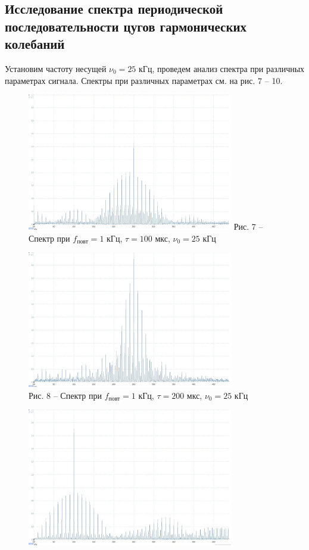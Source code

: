 \documentclass[a4paper,14pt]{article}
\begin{document}
\subsection*{Исследование спектра периодической последовательности цугов гармонических колебаний}

Установим частоту несущей $\nu_0 = 25$ кГц, проведем анализ спектра при различных параметрах сигнала. Спектры при различных параметрах см. на рис. 7 -- 10.

\begin{figure}[!h]
	\parbox[!h]{0.5\textwidth}{\null
		\centering
		\includegraphics[width = 9cm]{6.jpeg}
		Рис. 7 -- Спектр при $f_{\text{повт}} = 1$ кГц, $\tau = 100$ мкс, $\nu_0 =25$ кГц}
	\parbox[!h]{0.5\textwidth}{\null
		\centering
		\includegraphics[width = 9cm]{7.jpeg} \\
		Рис. 8 -- Спектр при $f_{\text{повт}} = 1$ кГц, $\tau = 200$ мкс, $\nu_0 = 25$ кГц}
	\parbox[!h]{0.5\textwidth}{\null
		\centering
		\includegraphics[width = 9cm]{8.jpeg}
}
\end{figure}
\end{document}
